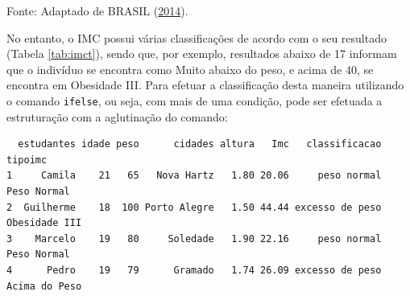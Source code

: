 \documentclass[12pt,brazil,oneside]{book}
\newenvironment{Shaded}{\begin{snugshade}}{\end{snugshade}}
\newcommand{\DecValTok}[1]{\textcolor[rgb]{0.00,0.00,0.81}{#1}}
\newcommand{\FloatTok}[1]{\textcolor[rgb]{0.00,0.00,0.81}{#1}}
\newcommand{\KeywordTok}[1]{\textcolor[rgb]{0.13,0.29,0.53}{\textbf{#1}}}
\newcommand{\NormalTok}[1]{#1}
\newcommand{\OperatorTok}[1]{\textcolor[rgb]{0.81,0.36,0.00}{\textbf{#1}}}
\newcommand{\StringTok}[1]{\textcolor[rgb]{0.31,0.60,0.02}{#1}}
\begin{document}
Fonte: Adaptado de BRASIL (\protect\hyperlink{ref-brasil2014}{2014}).

No entanto, o IMC possui várias classificações de acordo com o seu resultado (Tabela \ref{tab:imct}), sendo que, por exemplo, resultados abaixo de 17 informam que o indivíduo se encontra como Muito abaixo do peso, e acima de 40, se encontra em Obesidade III. Para efetuar a classificação desta maneira utilizando o comando \texttt{ifelse}, ou seja, com mais de uma condição, pode ser efetuada a estruturação com a aglutinação do comando:

\begin{Shaded}
\end{Shaded}

\begin{verbatim}
  estudantes idade peso      cidades altura   Imc   classificacao       tipoimc
1     Camila    21   65   Nova Hartz   1.80 20.06     peso normal   Peso Normal
2  Guilherme    18  100 Porto Alegre   1.50 44.44 excesso de peso Obesidade III
3    Marcelo    19   80     Soledade   1.90 22.16     peso normal   Peso Normal
4      Pedro    19   79      Gramado   1.74 26.09 excesso de peso Acima do Peso
\end{verbatim}
\end{document}

